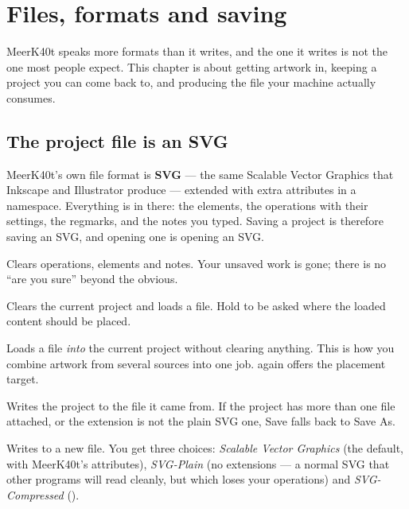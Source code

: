 \chapter{Files, formats and saving}
\label{ch:files}

MeerK40t speaks more formats than it writes, and the one it writes is not the one
most people expect. This chapter is about getting artwork in, keeping a project
you can come back to, and producing the file your machine actually consumes.

\section{The project file is an SVG}

MeerK40t's own file format is \textbf{SVG} --- the same Scalable Vector Graphics
that Inkscape and Illustrator produce --- extended with extra attributes in a
 namespace. Everything is in there: the elements, the operations
with their settings, the regmarks, and the notes you typed. Saving a project is
therefore saving an SVG, and opening one is opening an SVG.

\begin{description}[leftmargin=1.4em,style=nextline]
  \item[\menu{File>New} (\key{Ctrl+N})] Clears operations, elements and notes.
        Your unsaved work is gone; there is no ``are you sure'' beyond the
        obvious.
  \item[\menu{File>Open Project} (\key{Ctrl+O})] Clears the current project and
        loads a file. Hold  to be asked where the loaded content
        should be placed.
  \item[\menu{File>Import File}] Loads a file \emph{into} the current project
        without clearing anything. This is how you combine artwork from several
        sources into one job.  again offers the placement target.
  \item[\menu{File>Save} (\key{Ctrl+S})] Writes the project to the file it came
        from. If the project has more than one file attached, or the extension is
        not the plain SVG one, Save falls back to Save As.
  \item[\menu{File>Save As} (\key{Ctrl+Shift+S})] Writes to a new file. You get
        three choices: \emph{Scalable Vector Graphics} (the default, with
        MeerK40t's attributes), \emph{SVG-Plain} (no extensions --- a normal SVG
        that other programs will read cleanly, but which loses your operations)
        and \emph{SVG-Compressed} ().
\end{description}


